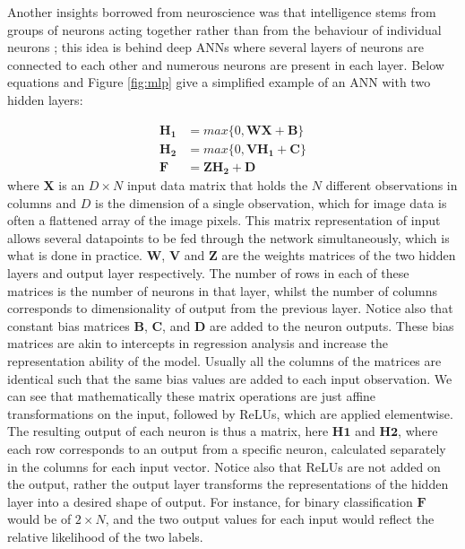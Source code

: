 \documentclass[12pt]{report}
\begin{document}
Another insights borrowed from neuroscience was that intelligence stems from groups of neurons acting together rather than from the behaviour of individual neurons \cite{Goodfellow2016}; this idea is behind deep ANNs where several layers of neurons are connected to each other and numerous neurons are present in each layer. Below equations and Figure \ref{fig:mlp} give a simplified example of an ANN with two hidden layers:

\begin{align} \label{mlp_eq}
  \mathbf{H_1} &= max\{0, \mathbf{W}\mathbf{X} + \mathbf{B}\} \\
  \mathbf{H_2} &= max\{0, \mathbf{V}\mathbf{H_1} + \mathbf{C}\} \\ 
  \mathbf{F} &= \mathbf{Z} \mathbf{H_{2}} + \mathbf{D} 
\end{align}
where $\mathbf{X}$ is an $D\times N$ input data matrix that holds the $N$ different observations in columns and $D$ is the dimension of a single observation, which for image data is often a flattened array of the image pixels. This matrix representation of input allows several datapoints to be fed through the network simultaneously, which is what is done in practice. $\mathbf{W}$, $\mathbf{V}$ and $\mathbf{Z}$ are the weights matrices of the two hidden layers and output layer respectively. The number of rows in each of these matrices is the number of neurons in that layer, whilst the number of columns corresponds to dimensionality of output from the previous layer. Notice also that constant bias matrices $\mathbf{B}$, $\mathbf{C}$, and $\mathbf{D}$ are added to the neuron outputs. These bias matrices are akin to intercepts in regression analysis and increase the representation ability of the model. Usually all the columns of the matrices are identical such that the same bias values are added to each input observation. We can see that mathematically these matrix operations are just affine transformations on the input, followed by ReLUs, which are applied elementwise. The resulting output of each neuron is thus a matrix, here $\mathbf{H1}$ and $\mathbf{H2}$, where each row corresponds to an output from a specific neuron, calculated separately in the columns for each input vector. Notice also that ReLUs are not added on the output, rather the output layer transforms the representations of the hidden layer into a desired shape of output. For instance, for binary classification $\mathbf{F}$ would be of $2 \times N$, and the two output values for each input would reflect the relative likelihood of the two labels.
\end{document}
